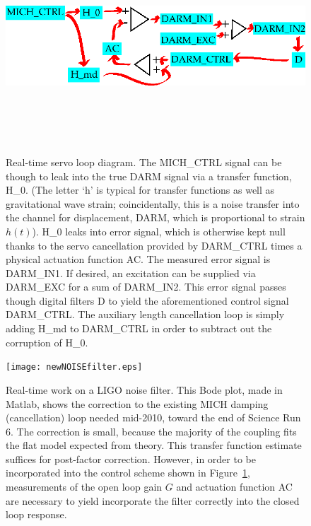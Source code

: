	\begin{figure}
	\begin{center}
	\includegraphics[height=80mm, width=148mm]{servo_loop.eps}
	\caption{Real-time servo loop diagram. The MICH\_CTRL signal can be though to leak into the true DARM signal via a transfer function, H\_0. (The letter `h' is typical for transfer functions as well as gravitational wave strain; coincidentally, this is a noise transfer into the channel for displacement, DARM, which is proportional to strain $h(t)$). H\_0 leaks into error signal, which is otherwise kept null thanks to the servo cancellation provided by DARM\_CTRL times a physical actuation function AC. The measured error signal is DARM\_IN1. If desired, an excitation can be supplied via DARM\_EXC for a sum of DARM\_IN2. This error signal passes though digital filters D to yield the aforementioned control signal DARM\_CTRL. The auxiliary length cancellation loop is simply adding H\_md to DARM\_CTRL in order to subtract out the corruption of H\_0.}
	\label{servo_loop_realtime}
	\end{center}
	\end{figure}

	\begin{figure}
	\begin{center}
	\texttt{[image: newNOISEfilter.eps]}
	\caption{Real-time work on a LIGO noise filter. This Bode plot, made in Matlab, shows the correction to the existing MICH damping (cancellation) loop needed mid-2010, toward the end of Science Run 6. The correction is small, because the majority of the coupling fits the flat model expected from theory. This transfer function estimate suffices for post-factor correction. However, in order to be incorporated into the control scheme shown in Figure~\ref{servo_loop_realtime}, measurements of the open loop gain $G$ and actuation function AC are necessary to yield incorporate the filter correctly into the closed loop response.} 
	\label{newNOISEfilter}
	\end{center}
	\end{figure}

